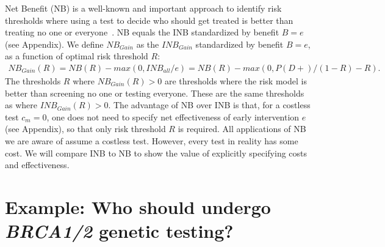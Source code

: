 \documentclass[11pt, letterpaper]{article}
\begin{document}
Net Benefit (NB) is a well-known and important approach to identify risk thresholds where using a test to decide who should get treated is better than treating no one or everyone~\citep{Vickers2006}.  NB equals the INB standardized by benefit $B=e$ (see Appendix).  We define $NB_{Gain}$ as the $INB_{Gain}$ standardized by benefit $B=e$, as a function of optimal risk threshold $R$:
\begin{eqnarray*}
	N\!B_{Gain}(R) = N\!B(R) - max(0,INB_{all}/e) = N\!B(R) - max(0,P(D+)/(1-R)-R).
\end{eqnarray*}
The thresholds $R$ where $N\!B_{Gain}(R)>0$ are thresholds where the risk model is better than screening no one or testing everyone.  These are the same thresholds as where $INB_{Gain}(R)>0$.  The advantage of NB over INB is that, for a costless test $c_m=0$, one does not need to specify net effectiveness of early intervention $e$ (see Appendix), so that only risk threshold $R$ is required.  All applications of NB we are aware of assume a costless test.   However, every test in reality has some cost.  We will compare INB to NB to show the value of explicitly specifying costs and effectiveness.  


%


\section{Example: Who should undergo \textit{BRCA1/2} genetic testing?}
\label{sec:BRCA}
\end{document}
